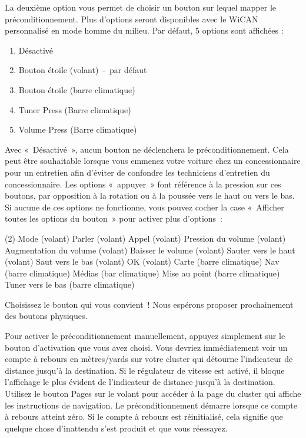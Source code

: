 \documentclass[superscriptaddress,onecolumn,floatfix]{revtex4-2}
\begin{document}
La deuxième option vous permet de choisir un bouton sur lequel mapper le préconditionnement. Plus d'options seront disponibles avec le WiCAN personnalisé en mode homme du milieu. Par défaut, 5 options sont affichées :
\begin{enumerate}
  \item Désactivé
  \item Bouton étoile (volant) - par défaut
  \item Bouton étoile (barre climatique)
  \item Tuner Press (Barre climatique)
  \item Volume Press (Barre climatique)
\end{enumerate}
Avec « Désactivé », aucun bouton ne déclenchera le préconditionnement. Cela peut être souhaitable lorsque vous emmenez votre voiture chez un concessionnaire pour un entretien afin d'éviter de confondre les techniciens d'entretien du concessionnaire. Les options « appuyer » font référence à la pression sur ces boutons, par opposition à la rotation ou à la poussée vers le haut ou vers le bas. Si aucune de ces options ne fonctionne, vous pouvez cocher la case « Afficher toutes les options du bouton » pour activer plus d'options :
\begin{tasks}(2)
  \task Mode (volant)
  \task Parler (volant)
  \task Appel (volant)
  \task Pression du volume (volant)
  \task Augmentation du volume (volant)
  \task Baisser le volume (volant)
  \task Sauter vers le haut (volant)
  \task Saut vers le bas (volant)
  \task OK (volant)
  \task Carte (barre climatique)
  \task Nav (barre climatique)
  \task Médias (bar climatique)
  \task Mise au point (barre climatique)
  \task Tuner vers le bas (barre climatique)
\end{tasks}
Choisissez le bouton qui vous convient ! Nous espérons proposer prochainement des boutons physiques.

Pour activer le préconditionnement manuellement, appuyez simplement sur le bouton d'activation que vous avez choisi. Vous devriez immédiatement voir un compte à rebours en mètres/yards sur votre cluster qui détourne l'indicateur de distance jusqu'à la destination. Si le régulateur de vitesse est activé, il bloque l'affichage le plus évident de l'indicateur de distance jusqu'à la destination. Utilisez le bouton Pages sur le volant pour accéder à la page du cluster qui affiche les instructions de navigation. Le préconditionnement démarre lorsque ce compte à rebours atteint zéro. Si le compte à rebours est réinitialisé, cela signifie que quelque chose d'inattendu s'est produit et que vous réessayez. 
\end{document}
